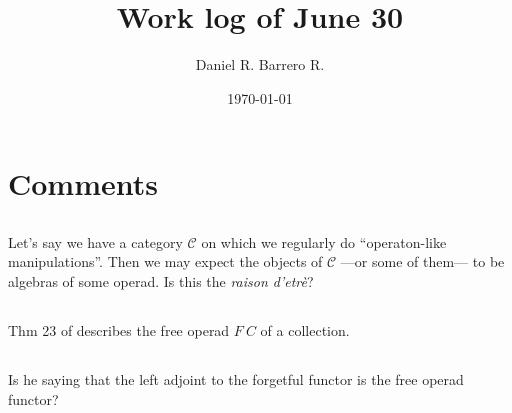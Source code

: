\documentclass{amsart}
\title{Work log of June 30}
\author{Daniel R. Barrero R.}
\date{\today}
\begin{document}
\maketitle

\section{Comments}

\subsection{} Let's say we have a category $\mathcal{C}$ on which we
regularly do ``operaton-like manipulations''. Then we may expect the
objects of $\mathcal{C}$ ---or some of them--- to be algebras of some
operad. Is this the \emph{raison d'etrè}?

\subsection{} Thm 23 of \cite{baezOtter} describes the free operad $F \ C$
of a collection.

\subsection{} Is he saying that the left adjoint to the forgetful functor
is the free operad functor?



\end{document}
